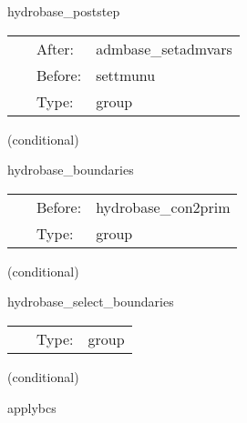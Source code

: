 \hspace{5mm} hydrobase\_poststep 

\hspace{5mm}{\it post step tasks for hydro thorns } 


\hspace{5mm}

 \begin{tabular*}{160mm}{cll} 
~ & After:  & admbase\_setadmvars \\ 
~ & Before:  & settmunu \\ 
~ & Type:  & group \\ 
\end{tabular*} 


\vspace{5mm}

   (conditional) 

\hspace{5mm} hydrobase\_boundaries 

\hspace{5mm}{\it hydrobase-internal boundary conditions group } 


\hspace{5mm}

 \begin{tabular*}{160mm}{cll} 
~ & Before:  & hydrobase\_con2prim \\ 
~ & Type:  & group \\ 
\end{tabular*} 


\vspace{5mm}

   (conditional) 

\hspace{5mm} hydrobase\_select\_boundaries 

\hspace{5mm}{\it group to schedule the boundary condition functions } 


\hspace{5mm}

 \begin{tabular*}{160mm}{cll} 
~ & Type:  & group \\ 
\end{tabular*} 


\vspace{5mm}

   (conditional) 

\hspace{5mm} applybcs 


